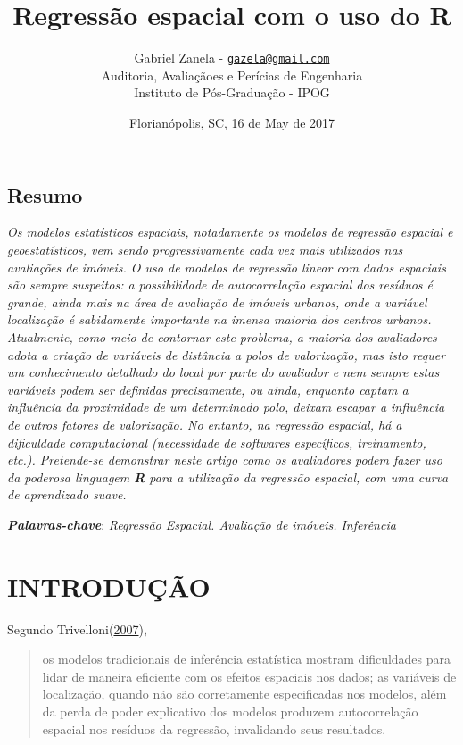 \documentclass[12pt,]{article}
\title{Regressão espacial com o uso do R}
\author{Gabriel Zanela -
\href{mailto:gazela@gmail.com}{\nolinkurl{gazela@gmail.com}} \\ Auditoria, Avaliaçãoes e Perícias de Engenharia \\ Instituto de Pós-Graduação - IPOG}
\date{Florianópolis, SC, 16 de May de 2017}
\begin{document}
\maketitle

\subsection*{Resumo}\label{resumo}

\emph{Os modelos estatísticos espaciais, notadamente os modelos de
regressão espacial e geoestatísticos, vem sendo progressivamente cada
vez mais utilizados nas avaliações de imóveis. O uso de modelos de
regressão linear com dados espaciais são sempre suspeitos: a
possibilidade de autocorrelação espacial dos resíduos é grande, ainda
mais na área de avaliação de imóveis urbanos, onde a variável
localização é sabidamente importante na imensa maioria dos centros
urbanos. Atualmente, como meio de contornar este problema, a maioria dos
avaliadores adota a criação de variáveis de distância a polos de
valorização, mas isto requer um conhecimento detalhado do local por
parte do avaliador e nem sempre estas variáveis podem ser definidas
precisamente, ou ainda, enquanto captam a influência da proximidade de
um determinado polo, deixam escapar a influência de outros fatores de
valorização. No entanto, na regressão espacial, há a dificuldade
computacional (necessidade de softwares específicos, treinamento, etc.).
Pretende-se demonstrar neste artigo como os avaliadores podem fazer uso
da poderosa linguagem \textbf{R} para a utilização da regressão
espacial, com uma curva de aprendizado suave.}

\textbf{\emph{Palavras-chave}}: \emph{Regressão Espacial. Avaliação de
imóveis. Inferência}

\section{INTRODUÇÃO}\label{introducao}

Segundo Trivelloni(\protect\hyperlink{ref-trivelloni07}{2007}),

\begin{quote}
os modelos tradicionais de inferência estatística mostram dificuldades
para lidar de maneira eficiente com os efeitos espaciais nos dados; as
variáveis de localização, quando não são corretamente especificadas nos
modelos, além da perda de poder explicativo dos modelos produzem
autocorrelação espacial nos resíduos da regressão, invalidando seus
resultados.
\end{quote}
\end{document}
